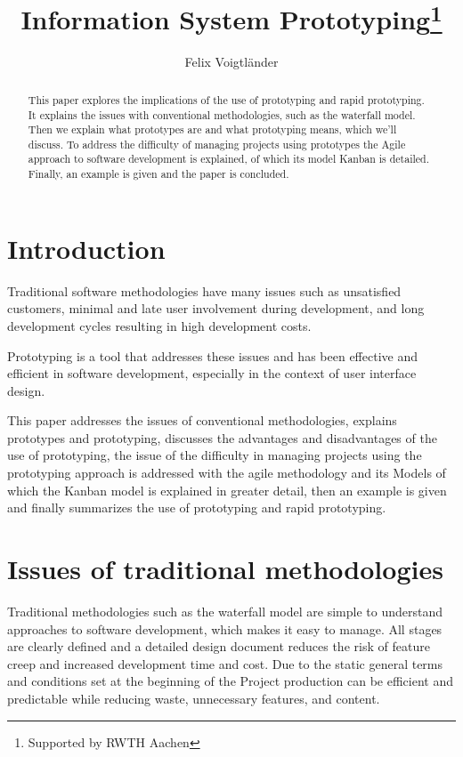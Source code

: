 \documentclass[runningheads]{llncs}
\begin{document}
%
\title{Information System Prototyping\thanks{Supported by RWTH Aachen}}
%
%
\author{Felix Voigtländer}
%
%
%
\maketitle              %
%
\begin{abstract}
This paper explores the implications of the use of prototyping and rapid prototyping.
It explains the issues with conventional methodologies, such as the waterfall model.
Then we explain what prototypes are and what prototyping means, which we'll discuss.
To address the difficulty of managing projects using prototypes the Agile approach
to software development is explained, of which its model Kanban is detailed.
Finally, an example is given and the paper is concluded.

\end{abstract}
%
%
%
\section{Introduction}
Traditional software methodologies have many issues such as unsatisfied customers,
minimal and late user involvement during development, and long development cycles resulting
in high development costs.

Prototyping is a tool that addresses these issues and has been effective and efficient
in software development, especially in the context of user interface design.

This paper addresses the issues of conventional methodologies, explains prototypes and prototyping,
discusses the advantages and disadvantages of the use of prototyping, the issue of the difficulty in
managing projects using the prototyping approach is addressed with the agile methodology
and its Models of which the Kanban model is explained in greater detail,
then an example is given and finally summarizes the use of prototyping and rapid prototyping.

\section{Issues of traditional methodologies}
Traditional methodologies such as the waterfall model \cite{ref_waterfall} 
are simple to understand approaches to software development, which makes it 
easy to manage. All stages are clearly defined and a detailed design document
reduces the risk of feature creep and increased development time and cost.
Due to the static general terms and conditions set at the beginning of the Project
production can be efficient and predictable while reducing waste, unnecessary features,
and content.
\end{document}
